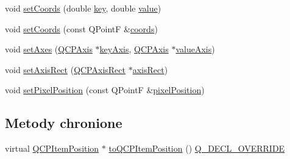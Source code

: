 \begin{DoxyCompactItemize}
void \hyperlink{class_q_c_p_item_position_aa988ba4e87ab684c9021017dcaba945f}{set\+Coords} (double \hyperlink{class_q_c_p_item_position_ac3cb2bddf5f89e5181830be30b93d090}{key}, double \hyperlink{class_q_c_p_item_position_a6817f7356d3a2b63e8446c6b6106dae1}{value})
\item 
void \hyperlink{class_q_c_p_item_position_acc70b3abc143287f806e5f154e5e07b0}{set\+Coords} (const Q\+PointF \&\hyperlink{class_q_c_p_item_position_a253d7adbb6d46299bd6cbc31aa8819f1}{coords})
\item 
void \hyperlink{class_q_c_p_item_position_a2185f45c75ac8cb9be89daeaaad50e37}{set\+Axes} (\hyperlink{class_q_c_p_axis}{Q\+C\+P\+Axis} $\ast$\hyperlink{class_q_c_p_item_position_ab99de7ae5766d246defb2de9f47eaf51}{key\+Axis}, \hyperlink{class_q_c_p_axis}{Q\+C\+P\+Axis} $\ast$\hyperlink{class_q_c_p_item_position_a8d3a039fb2e69df86b4015daa30dfd2d}{value\+Axis})
\item 
void \hyperlink{class_q_c_p_item_position_a0cd9b326fb324710169e92e8ca0041c2}{set\+Axis\+Rect} (\hyperlink{class_q_c_p_axis_rect}{Q\+C\+P\+Axis\+Rect} $\ast$\hyperlink{class_q_c_p_item_position_a7f10fa702a324880cc4de958f434cec7}{axis\+Rect})
\item 
void \hyperlink{class_q_c_p_item_position_a8d4f858f2089973967cf9cb81970ef0a}{set\+Pixel\+Position} (const Q\+PointF \&\hyperlink{class_q_c_p_item_position_a8be9a4787635433edecc75164beb748d}{pixel\+Position})
\end{DoxyCompactItemize}
\subsection*{Metody chronione}
\begin{DoxyCompactItemize}
\item 
virtual \hyperlink{class_q_c_p_item_position}{Q\+C\+P\+Item\+Position} $\ast$ \hyperlink{class_q_c_p_item_position_a008ff9ebe645a963671b68bcf7f7a1c0}{to\+Q\+C\+P\+Item\+Position} () \hyperlink{qcustomplot_8hh_a42cc5eaeb25b85f8b52d2a4b94c56f55}{Q\+\_\+\+D\+E\+C\+L\+\_\+\+O\+V\+E\+R\+R\+I\+DE}
\end{DoxyCompactItemize}
